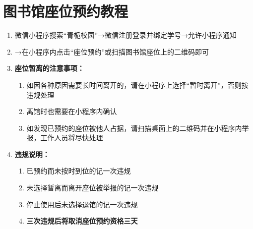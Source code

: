 \section[图书馆座位预约教程]{图书馆座位预约教程}
\begin{enumerate}
      \item 微信小程序搜索“青栀校园”→微信注册登录并绑定学号→允许小程序通知
      \item →在小程序内点击“座位预约”或扫描图书馆座位上的二维码即可
      \item \textbf{座位暂离的注意事项：}
            \begin{enumerate}
                  \item 如因各种原因需要长时间离开的，请在小程序上选择“暂时离开”，否则按违规处理
                  \item 离馆时也需要在小程序内确认
                  \item 如发现已预约的座位被他人占据，请扫描桌面上的二维码并在小程序内举报，工作人员将尽快处理
            \end{enumerate}
      \item \textbf{违规说明：}
            \begin{enumerate}
                  \item 已预约而未按时到位的记一次违规
                  \item 未选择暂离而离开座位被举报的记一次违规
                  \item 停止使用后未选择退馆的记一次违规
                  \item \textbf{三次违规后将取消座位预约资格三天}
            \end{enumerate}
\end{enumerate}

